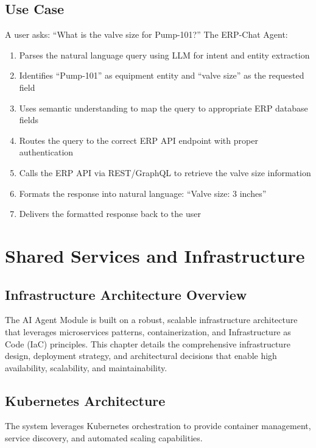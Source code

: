 \documentclass[12pt]{report}
\begin{document}
\section{Use Case}
A user asks: ``What is the valve size for Pump-101?'' The ERP-Chat Agent:
\begin{enumerate}
  \item Parses the natural language query using LLM for intent and entity extraction
  \item Identifies ``Pump-101'' as equipment entity and ``valve size'' as the requested field
  \item Uses semantic understanding to map the query to appropriate ERP database fields
  \item Routes the query to the correct ERP API endpoint with proper authentication
  \item Calls the ERP API via REST/GraphQL to retrieve the valve size information
  \item Formats the response into natural language: ``Valve size: 3 inches''
  \item Delivers the formatted response back to the user
\end{enumerate}

\chapter{Shared Services and Infrastructure}
\section{Infrastructure Architecture Overview}
The AI Agent Module is built on a robust, scalable infrastructure architecture that leverages microservices patterns, containerization, and Infrastructure as Code (IaC) principles. This chapter details the comprehensive infrastructure design, deployment strategy, and architectural decisions that enable high availability, scalability, and maintainability.



\section{Kubernetes Architecture}
The system leverages Kubernetes orchestration to provide container management, service discovery, and automated scaling capabilities.
\end{document}
